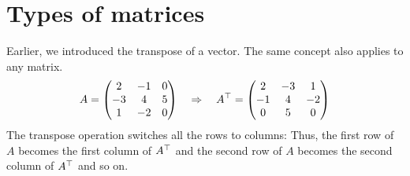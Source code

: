 \documentclass{ximera}
\begin{document}
\section{Types of matrices}
Earlier, we introduced the transpose of a vector. The same concept
also applies to any matrix.
\[
A = \begin{pmatrix}
2 & -1 & 0\\
-3 & 4 & 5\\
1 & -2 & 0
\end{pmatrix}
\quad\Rightarrow\quad
A^{\top} = \begin{pmatrix}
2 & -3 & 1\\
-1 & 4 & -2\\
0& 5 & 0
\end{pmatrix}
\]
The transpose operation switches all the rows to columns: Thus, the
first row of $A$ becomes the first column of $A^{\top}$ and the
second row of $A$ becomes the second column of $A^{\top}$ and so on.
\end{document}
